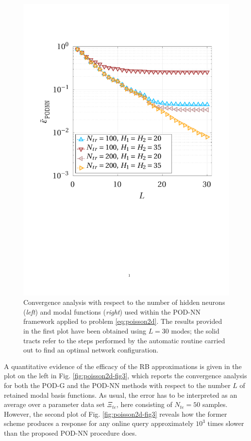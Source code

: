 \documentclass[longtitle]{elsarticle}
\numberwithin{equation}{section}
\theoremstyle{theorem}
\theoremstyle{definition}
\theoremstyle{remark}
\theoremstyle{proposition}
\numberwithin{figure}{section}
\begin{document}
\begin{figure}[t!]
			\includegraphics[scale = 0.385, trim = {1.5cm 9.8cm 1.5cm 3.8cm}, clip]{poisson2d_3_nn_comparison}
			
						
			\caption{Convergence analysis with respect to the number of hidden neurons (\emph{left}) and modal functions (\emph{right}) used within the POD-NN framework applied to problem \eqref{eq:poisson2d}. The results provided in the first plot have been obtained using $L = 30$ modes; the solid tracts refer to the steps performed by the automatic routine carried out to find an optimal network configuration.}
			\label{fig:poisson2d-fig4}
		\end{figure}	
		
		A quantitative evidence of the efficacy of the RB approximations is given in the plot on the left in Fig. \ref{fig:poisson2d-fig3}, which reports the convergence analysis for both the POD-G and the POD-NN methods with respect to the number $L$ of retained modal basis functions. As usual, the error has to be interpreted as an average over a parameter data set $\Xi_{te}$, here consisting of $N_{te} = 50$ samples. However, the second plot of Fig. \ref{fig:poisson2d-fig3} reveals how the former scheme produces a response for any online query approximately $10^3$ times slower than the proposed POD-NN procedure does. \\ 
\end{document}
